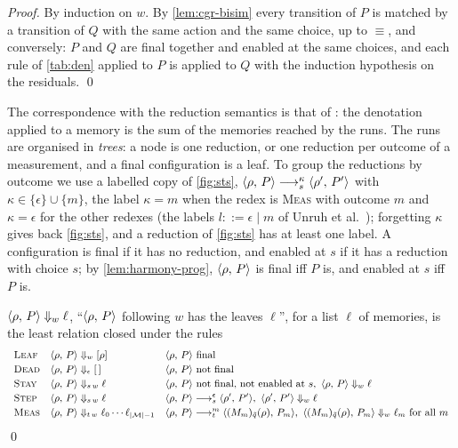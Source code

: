 \begin{proof}
By induction on $w$. By \cref{lem:cgr-bisim} every transition of $P$ is
matched by a transition of $Q$ with the same action and the same choice, up
to $\equiv$, and conversely: $P$ and $Q$ are final together and enabled at
the same choices, and each rule of \cref{tab:den} applied to $P$ is applied to
$Q$ with the induction hypothesis on the residuals.
\qed
\end{proof}

The correspondence with the reduction semantics is that of
\cite[Theorem 3.1]{UVY26}: the denotation applied to a memory is the sum of
the memories reached by the runs. The runs are organised in \emph{trees}: a
node is one reduction, or one reduction per outcome of a measurement, and a
final configuration is a leaf. To group the reductions by outcome we use a
labelled copy of \cref{fig:sts}, $\langle \rho ,\, P \rangle \longrightarrow_{s}^{\kappa}
\langle \rho' ,\, P' \rangle$ with $\kappa \in \{\epsilon\} \cup \{m\}$, the label
$\kappa = m$ when the redex is \textsc{Meas} with outcome $m$ and
$\kappa = \epsilon$ for the other redexes (the labels $l ::= \epsilon \mid m$
of Unruh et al.~\cite{UVY26}); forgetting $\kappa$ gives back \cref{fig:sts}, and a
reduction of \cref{fig:sts} has at least one label. A configuration is final
if it has no reduction, and enabled at $s$ if it has a reduction with choice
$s$; by \cref{lem:harmony-prog}, $\langle \rho ,\, P \rangle$ is final iff $P$ is, and
enabled at $s$ iff $P$ is.

\begin{definition}\label{def:tree}
$\langle \rho ,\, P \rangle \Downarrow_{w} \ell$, ``$\langle \rho ,\, P \rangle$ following $w$ has
the leaves $\ell$'', for a list $\ell$ of memories, is the least relation
closed under the rules
\[
\footnotesize
\begin{array}{l@{\quad}l@{\quad}l}
\textsc{Leaf} & \tree{\conf{\rho}{P}}{w}{[\rho]}{} & \conf{\rho}{P} \text{ final} \\[2pt]
\textsc{Dead} & \tree{\conf{\rho}{P}}{\epsilon}{[\,]}{} & \conf{\rho}{P} \text{ not final} \\[2pt]
\textsc{Stay} & \tree{\conf{\rho}{P}}{s\,w}{\ell}{}
  & \conf{\rho}{P} \text{ not final, not enabled at } s,\ \tree{\conf{\rho}{P}}{w}{\ell}{} \\[2pt]
\textsc{Step} & \tree{\conf{\rho}{P}}{s\,w}{\ell}{}
  & \conf{\rho}{P} \red_{s}^{\epsilon} \conf{\rho'}{P'},\ \tree{\conf{\rho'}{P'}}{w}{\ell}{} \\[2pt]
\textsc{Meas} & \tree{\conf{\rho}{P}}{t\,w}{\ell_0 \cdots \ell_{|\M|-1}}{}
  & \conf{\rho}{P} \red_{t}^{m} \conf{\br}{P_m},\ \tree{\conf{\br}{P_m}}{w}{\ell_m}{}
    \text{ for all } m
\end{array}
\]
\qed
\end{definition}

